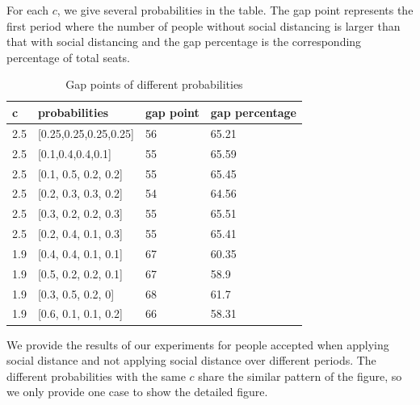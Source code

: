 For each $c$, we give several probabilities in the table. The gap point represents the first period where the number of people without social distancing is larger than that with social distancing and the gap percentage is the corresponding percentage of total seats.




\begin{table}[ht]
  \centering
  \caption{Gap points of different probabilities}
  \begin{tabular}{|l|l|l|l|}
  \hline
  c  & probabilities & gap point & gap percentage \\
  \hline
  2.5  & [0.25,0.25,0.25,0.25] & 56 & 65.21 \\
  2.5  & [0.1,0.4,0.4,0.1] & 55 & 65.59 \\
  2.5  & [0.1, 0.5, 0.2, 0.2] & 55 & 65.45 \\
  2.5  & [0.2, 0.3, 0.3, 0.2] & 54 & 64.56 \\
  2.5  & [0.3, 0.2, 0.2, 0.3] & 55 & 65.51\\
  2.5  & [0.2, 0.4, 0.1, 0.3] & 55 & 65.41 \\
  1.9  & [0.4, 0.4, 0.1, 0.1] & 67 & 60.35 \\
  1.9  & [0.5, 0.2, 0.2, 0.1] & 67 & 58.9  \\
  1.9  & [0.3, 0.5, 0.2, 0]  &  68 & 61.7  \\
  1.9  & [0.6, 0.1, 0.1, 0.2] & 66 & 58.31 \\
  \hline
  \end{tabular}
\end{table}


We provide the results of our experiments for people accepted when applying social distance and not applying social distance over different periods. The different probabilities with the same $c$ share the similar pattern of the figure, so we only provide one case to show the detailed figure.


